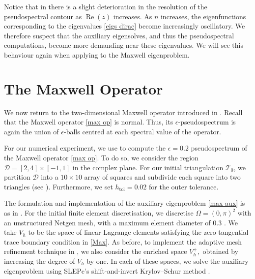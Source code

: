  Notice that in  there is a slight deterioration in the resolution of the pseudospectral contour as $\operatorname{Re}(z)$ increases. As  $n$ increases, the eigenfunctions corresponding to the eigenvalues \eqref{eigs dirac} become increasingly oscillatory. We therefore suspect that the auxiliary eigensolves, and thus the pseudospectral computations, become more demanding near these eigenvalues. We will see this behaviour again when applying  to the Maxwell eigenproblem.





\section{The Maxwell Operator} \label{maxwell results}

We now return to the two-dimensional Maxwell operator introduced in .  Recall that the Maxwell operator \eqref{max op} is normal. Thus, its $\epsilon$-pseudospectrum is again the union of $\epsilon$-balls centred at each spectral value of the operator.

For our numerical experiment, we use  to compute the $\epsilon = 0.2$ pseudospectrum of the Maxwell operator \eqref{max op}. To do so,
we consider the region $\mathcal{D} = [2, 4] \times [-1, 1]$ in the complex plane. For our initial triangulation $\mathcal{T}_0$, we partition $\mathcal{D}$ into a $10 \times 10$ array of squares and subdivide each square into two triangles (see ). Furthermore, we set $h_{\text{tol}} = 0.02$ for the outer tolerance. 

The formulation and implementation of the auxiliary eigenproblem \eqref{max aux} is as in . For the initial finite element discretisation, we discretise $\Omega = (0, \pi)^2$ with an unstructured Netgen mesh, with a maximum element diameter of $0.3$ \cite{Schoberl1997}. We take $V_h$ to be the space of linear Lagrange elements satisfying the zero tangential trace boundary condition in \eqref{Max}.
As before, to implement the adaptive mesh refinement technique in , we also consider the enriched space $V_h^+,$ obtained by increasing the degree of $V_h$ by one. In each of these spaces, we solve the auxiliary eigenproblem using SLEPc's shift-and-invert Krylov--Schur method \cite{krylov, slep}.

